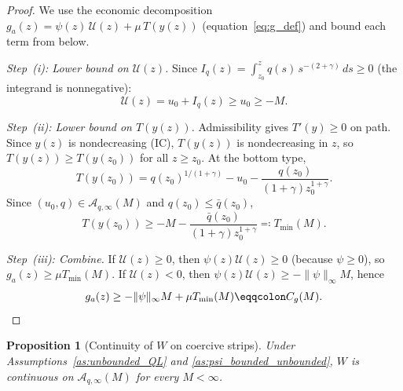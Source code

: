 \documentclass[12pt,a4paper]{article}
\theoremstyle{definition}
\theoremstyle{plain}
\newtheorem{proposition}{Proposition}[section]
\theoremstyle{remark}
\newcommand{\zlow}{z_{\scriptscriptstyle 0}}
\newcommand{\calU}{\mathcal{U}}
\begin{document}
\begin{proof}
We use the economic decomposition
$g_a(z) = \psi(z)\,\calU(z) + \mu\,T(y(z))$
(equation~\eqref{eq:g_def}) and bound each term from below.

\emph{Step~(i): Lower bound on $\calU(z)$.}
Since $I_q(z) = \int_{\zlow}^z
q(s)\,s^{-(2+\gamma)}\,ds \geq 0$ (the integrand is
nonnegative):
\[
  \calU(z) = u_0 + I_q(z) \geq u_0 \geq -M.
\]

\emph{Step~(ii): Lower bound on $T(y(z))$.}
Admissibility gives $T'(y) \geq 0$ on path.  Since
$y(z)$ is nondecreasing (IC), $T(y(z))$ is
nondecreasing in $z$, so $T(y(z)) \geq T(y(\zlow))$
for all $z \geq \zlow$.  At the bottom type,
\[
  T(y(\zlow))
  = q(\zlow)^{1/(1+\gamma)} - u_0
  - \frac{q(\zlow)}{(1+\gamma)\zlow^{1+\gamma}}.
\]
Since $(u_0,q) \in \mathcal{A}_{q,\infty}(M)$ and
$q(\zlow) \leq \bar q(\zlow)$,
\[
  T(y(\zlow)) \geq -M
  - \frac{\bar q(\zlow)}{(1+\gamma)\zlow^{1+\gamma}}
  \eqqcolon T_{\min}(M).
\]

\emph{Step~(iii): Combine.}
If $\calU(z) \geq 0$, then $\psi(z)\calU(z) \geq 0$
(because $\psi \geq 0$), so
$g_a(z) \geq \mu T_{\min}(M)$.  If $\calU(z) < 0$, then
$\psi(z)\calU(z) \geq -\|\psi\|_\infty M$, hence
\[
  g_a(z) \geq -\|\psi\|_\infty M + \mu T_{\min}(M)
  \eqqcolon C_g(M). \qedhere
\]
\end{proof}

\begin{proposition}[Continuity of $W$ on coercive strips]
\label{prop:continuity_unbounded}
Under Assumptions~\ref{as:unbounded_QL} and
\ref{as:psi_bounded_unbounded}, $W$ is continuous on
$\mathcal{A}_{q,\infty}(M)$ for every $M < \infty$.
\end{proposition}
\end{document}
